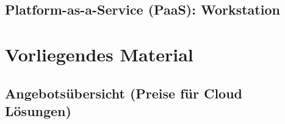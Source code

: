 \subsection{Platform-as-a-Service (PaaS): Workstation}



\section{Vorliegendes Material}

\subsection{Angebotsübersicht (Preise für Cloud Lösungen)}
